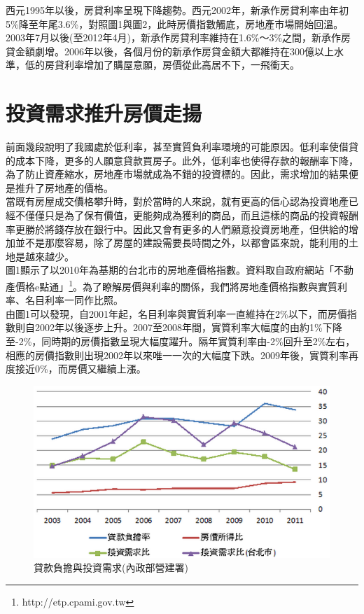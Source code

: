 \documentclass[12pt]{article}
\begin{document}
\begin{CJK}{UTF8}{cwmb}
西元1995年以後，房貸利率呈現下降趨勢。西元2002年，新承作房貸利率由年初5\%降至年尾3.6\%，對照圖1與圖2，此時房價指數觸底，房地產市場開始回溫。2003年7月以後(至2012年4月)，新承作房貸利率維持在1.6\%～3\%之間，新承作房貸金額劇增。2006年以後，各個月份的新承作房貸金額大都維持在300億以上水準，低的房貸利率增加了購屋意願，房價從此高居不下，一飛衝天。

\section{投資需求推升房價走揚}

前面幾段說明了我國處於低利率，甚至實質負利率環境的可能原因。低利率使借貸的成本下降，更多的人願意貸款買房子。此外，低利率也使得存款的報酬率下降，為了防止資產縮水，房地產市場就成為不錯的投資標的。因此，需求增加的結果便是推升了房地產的價格。\\

當既有房屋成交價格攀升時，對於當時的人來說，就有更高的信心認為投資地產已經不僅僅只是為了保有價值，更能夠成為獲利的商品，而且這樣的商品的投資報酬率更勝於將錢存放在銀行中。因此又會有更多的人們願意投資房地產，但供給的增加並不是那麼容易，除了房屋的建設需要長時間之外，以都會區來說，能利用的土地是越來越少。\\

圖1顯示了以2010年為基期的台北市的房地產價格指數。資料取自政府網站「不動產價格e點通」\footnote{http://etp.cpami.gov.tw}。為了瞭解房價與利率的關係，我們將房地產價格指數與實質利率、名目利率一同作比照。\\

由圖1可以發現，自2001年起，名目利率與實質利率一直維持在2\%以下，而房價指數則自2002年以後逐步上升。2007至2008年間，實質利率大幅度的由約1\%下降至-2\%，同時期的房價指數呈現大幅度躍升。隔年實質利率由-2\%回升至2\%左右，相應的房價指數則出現2002年以來唯一一次的大幅度下跌。2009年後，實質利率再度接近0\%，而房價又繼續上漲。\\

\begin{figure}[htp]
\centering
\includegraphics[scale=0.3]{03.png}
\caption{貸款負擔與投資需求(內政部營建署)}
\label{}
\end{figure}


\end{CJK}
\end{document}

